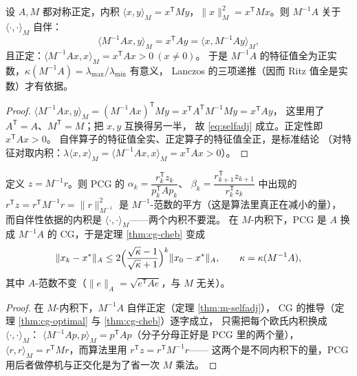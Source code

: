 \begin{theorem}[$M^{-1}A$ 在 $M$-内积下自伴正定]
\label{thm:m-selfadj}
设 $A,M$ 都对称正定，内积 $\langle x,y\rangle_M=x^{\mathsf T}My$，$\|x\|_M^2=x^{\mathsf T}Mx$。则
$M^{-1}A$ 关于 $\langle\cdot,\cdot\rangle_M$ 自伴：
\begin{equation}
  \langle M^{-1}Ax,y\rangle_M=x^{\mathsf T}Ay=\langle x,M^{-1}Ay\rangle_M ,
  \label{eq:selfadj}
\end{equation}
且正定：$\langle M^{-1}Ax,x\rangle_M=x^{\mathsf T}Ax>0\ (x\ne0)$。
于是 $M^{-1}A$ 的特征值全为正实数，$\kappa(M^{-1}A)=\lambda_{\max}/\lambda_{\min}$ 有意义，
Lanczos 的三项递推（因而 Ritz 值全是实数）才有依据。
\end{theorem}

\begin{proof}
$\langle M^{-1}Ax,y\rangle_M=(M^{-1}Ax)^{\mathsf T}My=x^{\mathsf T}A^{\mathsf T}M^{-1}My=x^{\mathsf T}Ay$，
这里用了 $A^{\mathsf T}=A$、$M^{\mathsf T}=M$；把 $x,y$ 互换得另一半，
故 \eqref{eq:selfadj} 成立。正定性即 $x^{\mathsf T}Ax>0$。
自伴算子的特征值全实、正定算子的特征值全正，是标准结论
（对特征对取内积：$\lambda\langle x,x\rangle_M=\langle M^{-1}Ax,x\rangle_M=x^{\mathsf T}Ax>0$）。
\end{proof}

\begin{corollary}
\label{cor:pcg}
定义 $z=M^{-1}r$。则 PCG 的
$\alpha_k=\dfrac{r_k^{\mathsf T}z_k}{p_k^{\mathsf T}Ap_k}$、
$\beta_k=\dfrac{r_{k+1}^{\mathsf T}z_{k+1}}{r_k^{\mathsf T}z_k}$ 中出现的
$r^{\mathsf T}z=r^{\mathsf T}M^{-1}r=\|r\|_{M^{-1}}^2$
是 $M^{-1}$-范数的平方（这是算法里真正在减小的量），
而自伴性依据的内积是 $\langle\cdot,\cdot\rangle_M$——两个内积不要混。
在 $M$-内积下，PCG 是 $A$ 换成 $M^{-1}A$ 的 CG，于是定理 \ref{thm:cg-cheb} 变成
\begin{equation}
  \|x_k-x^\ast\|_A\le2\Bigl(\frac{\sqrt{\kappa}-1}{\sqrt{\kappa}+1}\Bigr)^k\|x_0-x^\ast\|_A,
  \qquad \kappa=\kappa(M^{-1}A),
  \label{eq:pcg-bound}
\end{equation}
其中 $A$-范数不变（$\|e\|_A=\sqrt{e^{\mathsf T}Ae}$，与 $M$ 无关）。
\end{corollary}

\begin{proof}
在 $M$-内积下，$M^{-1}A$ 自伴正定（定理 \ref{thm:m-selfadj}），
CG 的推导（定理 \ref{thm:cg-optimal} 与 \ref{thm:cg-cheb}）逐字成立，
只需把每个欧氏内积换成 $\langle\cdot,\cdot\rangle_M$：
$\langle M^{-1}Ap,p\rangle_M=p^{\mathsf T}Ap$（分子分母正好是 PCG 里的两个量），
$\langle r,r\rangle_M=r^{\mathsf T}Mr$，而算法里用 $r^{\mathsf T}z=r^{\mathsf T}M^{-1}r$——
这两个是不同内积下的量，PCG 用后者做停机与正交化是为了省一次 $M$ 乘法。
\end{proof}

